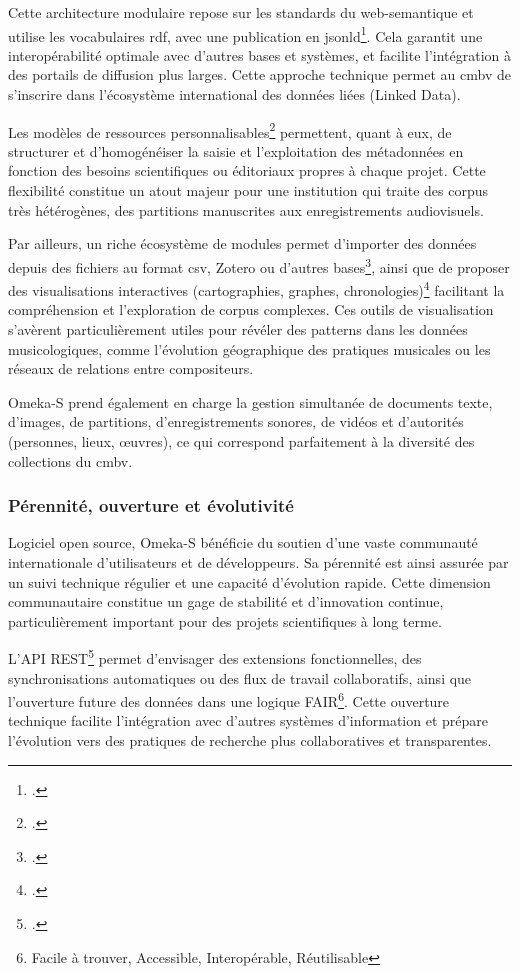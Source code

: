 Cette architecture modulaire repose sur les standards du \gls{web-semantique} et utilise les vocabulaires \gls{rdf}, avec une publication en \gls{jsonld}\footcite{OmekaProject}. Cela garantit une interopérabilité optimale avec d'autres bases et systèmes, et facilite l'intégration à des portails de diffusion plus larges. Cette approche technique permet au \gls{cmbv} de s'inscrire dans l'écosystème international des données liées (Linked Data).

Les modèles de ressources personnalisables\footcite{ResourceTemplatesOmeka} permettent, quant à eux, de structurer et d'homogénéiser la saisie et l'exploitation des métadonnées en fonction des besoins scientifiques ou éditoriaux propres à chaque projet. Cette flexibilité constitue un atout majeur pour une institution qui traite des corpus très hétérogènes, des partitions manuscrites aux enregistrements audiovisuels.

Par ailleurs, un riche écosystème de modules permet d'importer des données depuis des fichiers  au format \gls{csv}, Zotero ou d'autres bases\footcite{OmekaItemImporter}, ainsi que de proposer des visualisations interactives (cartographies, graphes, chronologies)\footcite{OmekaDataVisualization} facilitant la compréhension et l'exploration de corpus complexes. Ces outils de visualisation s'avèrent particulièrement utiles pour révéler des patterns dans les données musicologiques, comme l'évolution géographique des pratiques musicales ou les réseaux de relations entre compositeurs.

Omeka-S prend également en charge la gestion simultanée de documents texte, d'images, de partitions, d'enregistrements sonores, de vidéos et d'autorités (personnes, lieux, œuvres), ce qui correspond parfaitement à la diversité des collections du \gls{cmbv}.

\subsubsection{Pérennité, ouverture et évolutivité}

Logiciel open source, Omeka-S bénéficie du soutien d'une vaste communauté internationale d'utilisateurs et de développeurs. Sa pérennité est ainsi assurée par un suivi technique régulier et une capacité d'évolution rapide. Cette dimension communautaire constitue un gage de stabilité et d'innovation continue, particulièrement important pour des projets scientifiques à long terme.

L'API REST\footcite{RESTAPIOmeka} permet d'envisager des extensions fonctionnelles, des synchronisations automatiques ou des flux de travail collaboratifs, ainsi que l'ouverture future des données dans une logique FAIR\footnote{Facile à trouver, Accessible, Interopérable, Réutilisable}. Cette ouverture technique facilite l'intégration avec d'autres systèmes d'information et prépare l'évolution vers des pratiques de recherche plus collaboratives et transparentes.

